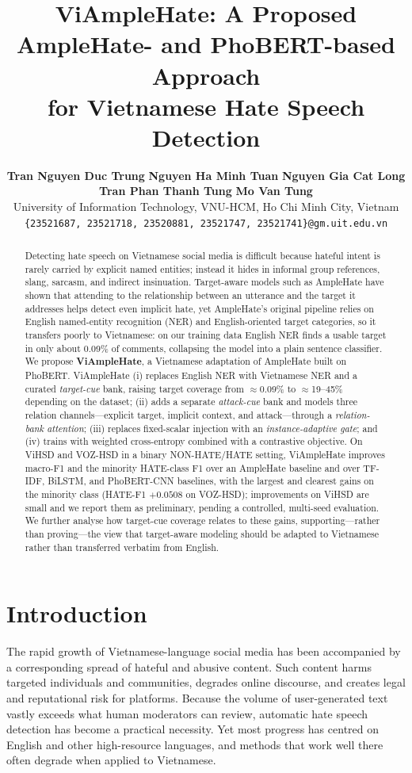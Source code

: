 \documentclass[11pt]{article}
\title{ViAmpleHate: A Proposed AmpleHate- and PhoBERT-based Approach\\ for Vietnamese Hate Speech Detection}
\author{
  \textbf{Tran Nguyen Duc Trung} \quad
  \textbf{Nguyen Ha Minh Tuan} \quad
  \textbf{Nguyen Gia Cat Long} \\
  \textbf{Tran Phan Thanh Tung} \quad
  \textbf{Mo Van Tung} \\[4pt]
  University of Information Technology, VNU-HCM, Ho Chi Minh City, Vietnam \\
  \texttt{\{23521687, 23521718, 23520881, 23521747, 23521741\}@gm.uit.edu.vn}
}
\begin{document}
\maketitle

\begin{abstract}
Detecting hate speech on Vietnamese social media is difficult because hateful intent is rarely carried by explicit named entities; instead it hides in informal group references, slang, sarcasm, and indirect insinuation. Target-aware models such as AmpleHate have shown that attending to the relationship between an utterance and the target it addresses helps detect even implicit hate, yet AmpleHate's original pipeline relies on English named-entity recognition (NER) and English-oriented target categories, so it transfers poorly to Vietnamese: on our training data English NER finds a usable target in only about 0.09\% of comments, collapsing the model into a plain sentence classifier. We propose \textbf{ViAmpleHate}, a Vietnamese adaptation of AmpleHate built on PhoBERT. ViAmpleHate (i) replaces English NER with Vietnamese NER and a curated \emph{target-cue} bank, raising target coverage from $\approx$0.09\% to $\approx$19--45\% depending on the dataset; (ii) adds a separate \emph{attack-cue} bank and models three relation channels---explicit target, implicit context, and attack---through a \emph{relation-bank attention}; (iii) replaces fixed-scalar injection with an \emph{instance-adaptive gate}; and (iv) trains with weighted cross-entropy combined with a contrastive objective. On ViHSD and VOZ-HSD in a binary NON-HATE/HATE setting, ViAmpleHate improves macro-F1 and the minority HATE-class F1 over an AmpleHate baseline and over TF-IDF, BiLSTM, and PhoBERT-CNN baselines, with the largest and clearest gains on the minority class (HATE-F1 $+0.0508$ on VOZ-HSD); improvements on ViHSD are small and we report them as preliminary, pending a controlled, multi-seed evaluation. We further analyse how target-cue coverage relates to these gains, supporting---rather than proving---the view that target-aware modeling should be adapted to Vietnamese rather than transferred verbatim from English.
\end{abstract}

\section{Introduction}

The rapid growth of Vietnamese-language social media has been accompanied by a corresponding spread of hateful and abusive content. Such content harms targeted individuals and communities, degrades online discourse, and creates legal and reputational risk for platforms. Because the volume of user-generated text vastly exceeds what human moderators can review, automatic hate speech detection has become a practical necessity. Yet most progress has centred on English and other high-resource languages, and methods that work well there often degrade when applied to Vietnamese.
\end{document}

